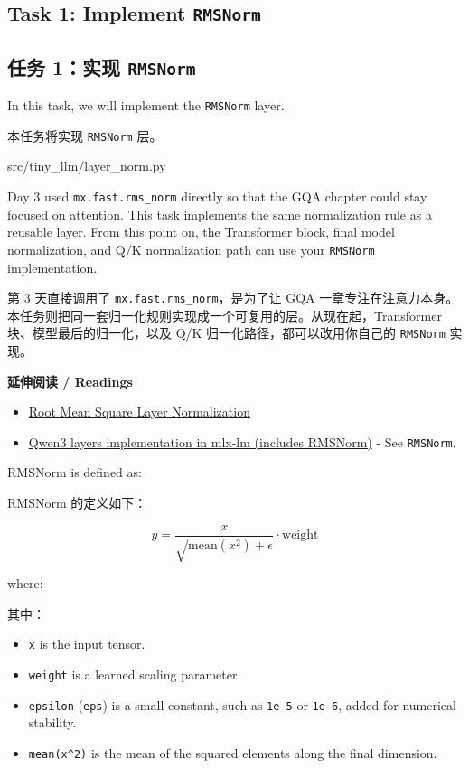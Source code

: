 \documentclass[11pt,a4paper]{article}
\newenvironment{zhpar}{%
  \par\smallskip\begingroup\color{zhcolor}\small\ignorespaces%
}{\endgroup\par\smallskip}
\begin{document}
\subsection*{Task 1: Implement \texttt{RMSNorm}}

\subsection*{任务 1：实现 \texttt{RMSNorm}}

In this task, we will implement the \texttt{RMSNorm} layer.

\begin{zhpar}
本任务将实现 \texttt{RMSNorm} 层。
\end{zhpar}
\begin{codeblock}
src/tiny_llm/layer_norm.py
\end{codeblock}

Day 3 used \texttt{mx.fast.rms\_norm} directly so that the GQA chapter could stay focused on attention. This task implements the same normalization rule as a reusable layer. From this point on, the Transformer block, final model normalization, and Q/K normalization path can use your \texttt{RMSNorm} implementation.

\begin{zhpar}
第 3 天直接调用了 \texttt{mx.fast.rms\_norm}，是为了让 GQA 一章专注在注意力本身。本任务则把同一套归一化规则实现成一个可复用的层。从现在起，Transformer 块、模型最后的归一化，以及 Q/K 归一化路径，都可以改用你自己的 \texttt{RMSNorm} 实现。
\end{zhpar}
\textbf{ 延伸阅读 / Readings}

\begin{itemize}[leftmargin=1.6em,itemsep=0.15em,parsep=0pt]
\item \href{https://arxiv.org/abs/1910.07467}{Root Mean Square Layer Normalization}
\item \href{https://github.com/ml-explore/mlx-lm/blob/main/mlx_lm/models/qwen3.py}{Qwen3 layers implementation in mlx-lm (includes RMSNorm)} - See \texttt{RMSNorm}.
\end{itemize}

RMSNorm is defined as:

\begin{zhpar}
RMSNorm 的定义如下：
\end{zhpar}
\[
y = \frac{x}{\sqrt{\text{mean}(x^2) + \epsilon}} \cdot \text{weight}
\]

where:

\begin{zhpar}
其中：
\end{zhpar}
\begin{itemize}[leftmargin=1.6em,itemsep=0.15em,parsep=0pt]
\item \texttt{x} is the input tensor.
\item \texttt{weight} is a learned scaling parameter.
\item \texttt{epsilon} (\texttt{eps}) is a small constant, such as \texttt{1e-5} or \texttt{1e-6}, added for numerical stability.
\item \texttt{mean(x\textasciicircum{}2)} is the mean of the squared elements along the final dimension.
\end{itemize}
\end{document}

